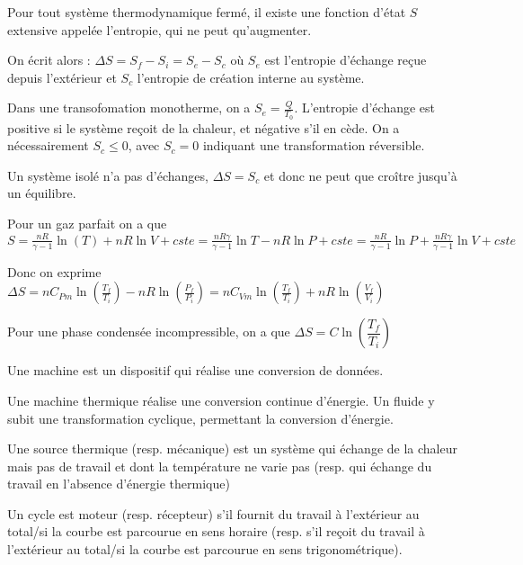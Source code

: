\documentclass[a4paper,12pt]{book}
\newcommand{\Def}[2]{\begin{tcolorbox}[colback=white,colframe=red!10!green!20!blue!75!, title=Définition : #1]#2\end{tcolorbox}}
\newcommand{\Thr}[2]{\begin{tcolorbox}[sharp corners, colback=white,colframe=red!10!blue!30!green!75!, title=Théorème : #1]#2\end{tcolorbox}}
\begin{document}
\Thr{Second Principe}{Pour tout système thermodynamique fermé, il existe une fonction d'état $S$ extensive appelée l'entropie, qui ne peut qu'augmenter.
\par On écrit alors : $\Delta S=S_f-S_i=S_e-S_c$ où $S_e$ est l'entropie d'échange reçue depuis l'extérieur et $S_c$ l'entropie de création interne au système.
\par Dans une transofomation monotherme, on a $S_e=\frac{Q}{T_0}$. L'entropie d'échange est positive si le système reçoit de la chaleur, et négative s'il en cède. On a nécessairement $S_c \leq 0$, avec $S_c=0$ indiquant une transformation réversible.
\par Un système isolé n'a pas d'échanges, $\Delta S = S_c$ et donc ne peut que croître jusqu'à un équilibre.}
\Thr{Variation d'entropie d'un gaz parfait}{Pour un gaz parfait on a que $S = \frac{nR}{\gamma-1}\ln(T) +nR\ln V + cste = \frac{nR\gamma}{\gamma-1}\ln T -nR\ln P + cste = \frac{nR}{\gamma-1}\ln P + \frac{nR\gamma}{\gamma-1}\ln V + cste$
\par Donc on exprime $\Delta S = nC_{Pm}\ln(\frac{T_f}{T_i}) - nR\ln(\frac{P_f}{P_i}) = nC_{Vm}\ln(\frac{T_f}{T_i})+nR\ln(\frac{V_f}{V_i})$
\par Pour une phase condensée incompressible, on a que $\Delta S = C\ln(\dfrac{T_f}{T_i})$}

\Def{Généralités sur les machines thermiques}{Une machine est un dispositif qui réalise une conversion de données.
\par Une machine thermique réalise une conversion continue d'énergie. Un fluide y subit une transformation cyclique, permettant la conversion d'énergie.
\par Une source thermique (resp. mécanique) est un système qui échange de la chaleur mais pas de travail et dont la température ne varie pas (resp. qui échange du travail en l'absence d'énergie thermique)
\par Un cycle est moteur (resp. récepteur) s'il fournit du travail à l'extérieur au total/si la courbe est parcourue en sens horaire (resp. s'il reçoit du travail à l'extérieur au total/si la courbe est parcourue en sens trigonométrique).}



\newpage
\end{document}
